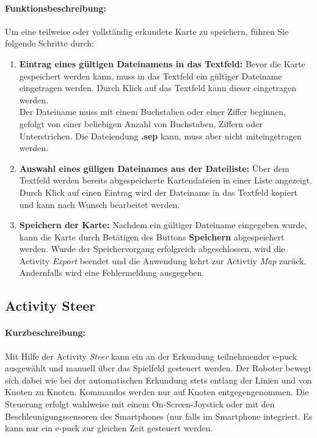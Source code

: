 \documentclass[10pt,a4paper]{article}
\begin{document}
 		\paragraph*{Funktionsbeschreibung:}
 		Um eine teilweise oder vollständig erkundete Karte zu speichern, führen Sie folgende Schritte durch:
 		\begin{enumerate}
 			\item \textbf{Eintrag eines gültigen Dateinamens in das Textfeld:} Bevor die Karte gespeichert werden kann, muss in das Textfeld ein
 			gültiger Dateiname eingetragen werden. Durch Klick auf das Textfeld kann dieser eingetragen werden. \\ 
 			Der Dateiname muss mit einem Buchstaben oder einer Ziffer beginnen, gefolgt von einer beliebigen Anzahl von Buchstaben, Ziffern oder
 			Unterstrichen. Die Dateiendung \textbf{.sep} kann, muss aber nicht miteingetragen werden.
 			\item \textbf{Auswahl eines güligen Dateinames aus der Dateiliste:} Über dem Textfeld werden bereits abgespeicherte Kartendateien in
 			einer Liste angezeigt. Durch Klick auf einen Eintrag wird der Dateiname in das Textfeld kopiert und kann nach Wunsch bearbeitet werden.
 			\item \textbf{Speichern der Karte:} Nachdem ein gültiger Dateiname eingegeben wurde, kann die Karte durch Betätigen des Buttons
 			\textbf{Speichern} abgespeichert werden. Wurde der Speichervorgang erfolgreich abgeschlossen, wird die Activity \textit{Export} beendet
 			und die Anwendung kehrt zur Activtiy \textit{Map} zurück. Andernfalls wird eine Fehlermeldung ausgegeben.
 		\end{enumerate}
 	
 	\subsection{Activity Steer}
 		\paragraph*{Kurzbeschreibung:}
 		Mit Hilfe der Activity \textit{Steer} kann ein an der Erkundung teilnehmender e-puck ausgewählt und manuell über das
 		Spielfeld gesteuert werden. Der Roboter bewegt sich dabei wie bei der automatischen Erkundung stets entlang der Linien und von Knoten zu
 		Knoten. Kommandos werden nur auf Knoten entgegengenommen. Die Steuerung erfolgt wahlweise mit einem On-Screen-Joystick oder mit den
 		Beschleunigungssensoren des Smartphones (nur falls im Smartphone integriert. Es kann nur ein e-puck zur gleichen Zeit gesteuert werden.
 		
\end{document}
